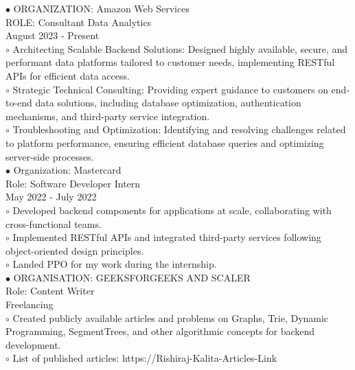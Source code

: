 \documentclass[11pt,a4paper]{article}
\begin{document}
\noindent $\bullet$ ORGANIZATION: Amazon Web Services\\[0.2cm]
ROLE: Consultant Data Analytics\\[0.2cm]
August 2023 - Present\\[0.2cm]
\hspace{0.5cm}$\circ$ Architecting Scalable Backend Solutions: Designed highly available, secure, and performant data platforms tailored to customer needs, implementing RESTful APIs for efficient data access.\\[0.1cm]
\hspace{0.5cm}$\circ$ Strategic Technical Consulting: Providing expert guidance to customers on end-to-end data solutions, including database optimization, authentication mechanisms, and third-party service integration.\\[0.1cm]
\hspace{0.5cm}$\circ$ Troubleshooting and Optimization: Identifying and resolving challenges related to platform performance, ensuring efficient database queries and optimizing server-side processes.\\[0.1cm]
\noindent $\bullet$ Organization: Mastercard\\[0.2cm]
Role: Software Developer Intern\\[0.2cm]
May 2022 - July 2022\\[0.2cm]
\hspace{0.5cm}$\circ$ Developed backend components for applications at scale, collaborating with cross-functional teams.\\[0.1cm]
\hspace{0.5cm}$\circ$ Implemented RESTful APIs and integrated third-party services following object-oriented design principles.\\[0.1cm]
\hspace{0.5cm}$\circ$ Landed PPO for my work during the internship.\\[0.1cm]
\noindent $\bullet$ ORGANISATION: GEEKSFORGEEKS AND SCALER\\[0.2cm]
Role: Content Writer\\[0.2cm]
Freelancing\\[0.2cm]
\hspace{0.5cm}$\circ$ Created publicly available articles and problems on Graphs, Trie, Dynamic Programming, SegmentTrees, and other algorithmic concepts for backend development.\\[0.1cm]
\hspace{0.5cm}$\circ$ List of published articles: https://Rishiraj-Kalita-Articles-Link\\[0.1cm]
\end{document}
